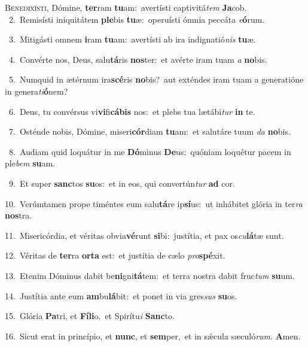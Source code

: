 \lettrine{\initial\textcolor{\initialcolor}{B}}{enedixísti,} Dómine, \textbf{ter}\-ram \textbf{tu}\-am:~\star avertísti captivitá\textit{tem} \textbf{Ja}\-cob.\\
{\numbfont\textcolor{\numbcolor}{~2.}}~Remisísti iniquitátem \textbf{ple}\-bis \textbf{tu}\-æ:~\star operuísti ómnia peccáta \textit{e}\-\textbf{ó}rum.\par
{\numbfont\textcolor{\numbcolor}{~3.}}~Mitigásti omnem \textbf{i}\-ram \textbf{tu}\-am:~\star avertísti ab ira indignatió\textit{nis} \textbf{tu}\-æ.\par
{\numbfont\textcolor{\numbcolor}{~4.}}~Convérte nos, Deus, salu\-\textbf{tá}\-ris \textbf{nos}\-ter:~\star et avérte iram tuam \textit{a} \textbf{no}\-bis.\par
{\numbfont\textcolor{\numbcolor}{~5.}}~Numquid in ætérnum ira\-\textbf{scé}\-ris \textbf{no}\-bis?~\star aut exténdes iram tuam a generatióne in genera\-\textit{ti}\-\textbf{ó}nem?\par
{\numbfont\textcolor{\numbcolor}{~6.}}~Deus, tu convérsus vi\-\textbf{vi}\-fi\-\textbf{cá}\-\textbf{bis} nos:~\star et plebs tua lætábi\textit{tur} \textbf{in} te.\par
{\numbfont\textcolor{\numbcolor}{~7.}}~Osténde nobis, Dómine, miseri\-\textbf{cór}\-diam \textbf{tu}\-am:~\star et salutáre tuum \textit{da} \textbf{no}\-bis.\par
{\numbfont\textcolor{\numbcolor}{~8.}}~Audiam quid loquátur in me \textbf{Dó}\-minus \textbf{De}\-us:~\star quóniam loquétur pacem in ple\textit{bem} \textbf{su}\-am.\par
{\numbfont\textcolor{\numbcolor}{~9.}}~Et super \textbf{sanc}\-tos \textbf{su}\-os:~\star et in eos, qui convertún\textit{tur} \textbf{ad} cor.\par
{\numbfont\textcolor{\numbcolor}{10.}}~Verúmtamen prope timéntes eum salu\-\textbf{tá}\-re ip\-\textbf{sí}\-us:~\star ut inhábitet glória in ter\textit{ra} \textbf{nos}\-tra.\par
{\numbfont\textcolor{\numbcolor}{11.}}~Misericórdia, et véritas obvia\-\textbf{vé}\-runt \textbf{si}\-bi:~\star justítia, et pax os\-\textit{cu}\-\textbf{lá}tæ sunt.\par
{\numbfont\textcolor{\numbcolor}{12.}}~Véritas de \textbf{ter}\-ra \textbf{or}\-\textbf{ta} est:~\star et justítia de cælo \textit{pro}\-\textbf{spé}xit.\par
{\numbfont\textcolor{\numbcolor}{13.}}~Etenim Dóminus dabit be\-\textbf{ni}\-gni\-\textbf{tá}\-tem:~\star et terra nostra dabit fruc\textit{tum} \textbf{su}\-um.\par
{\numbfont\textcolor{\numbcolor}{14.}}~Justítia ante eum \textbf{am}\-bu\-\textbf{lá}\-bit:~\star et ponet in via gres\textit{sus} \textbf{su}\-os.\par
{\numbfont\textcolor{\numbcolor}{15.}}~Glória \textbf{Pa}\-tri, et \textbf{Fí}\-\textbf{li}o,~\star et Spirítu\textit{i} \textbf{Sanc}\-to.\par
{\numbfont\textcolor{\numbcolor}{16.}}~Sicut erat in princípio, et \textbf{nunc}\-, et \textbf{sem}\-per,~\star et in sǽcula sæculó\-\textit{rum}\-. \textbf{A}\-men.\par
